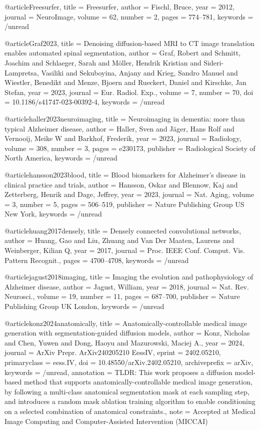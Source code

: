 @article{Freesurfer,
  title = {Freesurfer},
  author = {Fischl, Bruce},
  year = 2012,
  journal = {NeuroImage},
  volume = {62},
  number = {2},
  pages = {774--781},
  keywords = {/unread}
}

@article{Graf2023,
  title = {Denoising diffusion-based {{MRI}} to {{CT}} image translation enables automated spinal segmentation},
  author = {Graf, Robert and Schmitt, Joachim and Schlaeger, Sarah and M{\"o}ller, Hendrik Kristian and {Sideri-Lampretsa}, Vasiliki and Sekuboyina, Anjany and Krieg, Sandro Manuel and Wiestler, Benedikt and Menze, Bjoern and Rueckert, Daniel and Kirschke, Jan Stefan},
  year = 2023,
  journal = {Eur. Radiol. Exp.},
  volume = {7},
  number = {70},
  doi = {10.1186/s41747-023-00392-4},
  keywords = {/unread}
}

@article{haller2023neuroimaging,
  title = {Neuroimaging in dementia: more than typical {{Alzheimer}} disease},
  author = {Haller, Sven and J{\"a}ger, Hans Rolf and Vernooij, Meike W and Barkhof, Frederik},
  year = 2023,
  journal = {Radiology},
  volume = {308},
  number = {3},
  pages = {e230173},
  publisher = {Radiological Society of North America},
  keywords = {/unread}
}

@article{hansson2023blood,
  title = {Blood biomarkers for {{Alzheimer}}'s disease in clinical practice and trials},
  author = {Hansson, Oskar and Blennow, Kaj and Zetterberg, Henrik and Dage, Jeffrey},
  year = 2023,
  journal = {Nat. Aging},
  volume = {3},
  number = {5},
  pages = {506--519},
  publisher = {Nature Publishing Group US New York},
  keywords = {/unread}
}

@article{huang2017densely,
  title = {Densely connected convolutional networks},
  author = {Huang, Gao and Liu, Zhuang and Van Der Maaten, Laurens and Weinberger, Kilian Q},
  year = 2017,
  journal = {Proc. IEEE Conf. Comput. Vis. Pattern Recognit.},
  pages = {4700--4708},
  keywords = {/unread}
}

@article{jagust2018imaging,
  title = {Imaging the evolution and pathophysiology of {{Alzheimer}} disease},
  author = {Jagust, William},
  year = 2018,
  journal = {Nat. Rev. Neurosci.},
  volume = {19},
  number = {11},
  pages = {687--700},
  publisher = {Nature Publishing Group UK London},
  keywords = {/unread}
}

@article{konz2024anatomically,
  title = {Anatomically-controllable medical image generation with segmentation-guided diffusion models},
  author = {Konz, Nicholas and Chen, Yuwen and Dong, Haoyu and Mazurowski, Maciej A.},
  year = 2024,
  journal = {ArXiv Prepr. ArXiv240205210 EessIV},
  eprint = {2402.05210},
  primaryclass = {eess.IV},
  doi = {10.48550/arXiv.2402.05210},
  archiveprefix = {arXiv},
  keywords = {/unread},
  annotation = {TLDR: This work proposes a diffusion model-based method that supports anatomically-controllable medical image generation, by following a multi-class anatomical segmentation mask at each sampling step, and introduces a random mask ablation training algorithm to enable conditioning on a selected combination of anatomical constraints.},
  note = {Accepted at Medical Image Computing and Computer-Assisted Intervention (MICCAI)}
}

